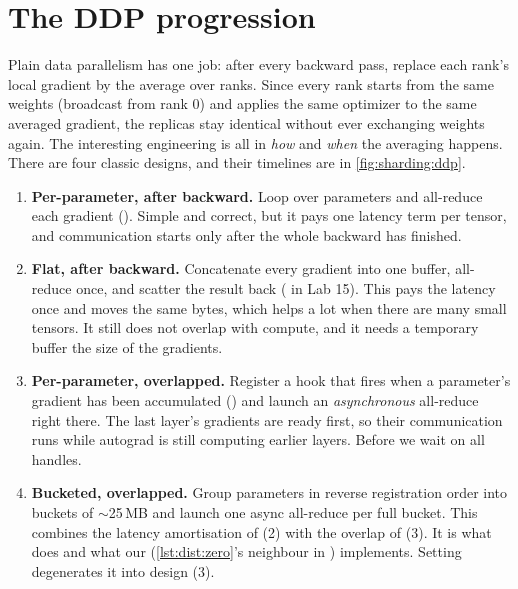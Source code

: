 \section{The DDP progression}\label{sec:sharding:ddp}

Plain data parallelism has one job: after every backward pass, replace each rank's local gradient
by the average over ranks. Since every rank starts from the same weights (broadcast from rank 0)
and applies the same optimizer to the same averaged gradient, the replicas stay identical without
ever exchanging weights again. The interesting engineering is all in \emph{how} and \emph{when}
the averaging happens. There are four classic designs, and their timelines are in
\cref{fig:sharding:ddp}.

\begin{enumerate}
  \item \textbf{Per-parameter, after backward.} Loop over parameters and all-reduce each
    gradient (). Simple and correct, but it pays one
    latency term per tensor, and communication starts only after the whole backward has finished.
  \item \textbf{Flat, after backward.} Concatenate every gradient into one buffer, all-reduce
    once, and scatter the result back ( in Lab 15). This pays the latency
    once and moves the same bytes, which helps a lot when there are many small tensors. It still
    does not overlap with compute, and it needs a temporary buffer the size of the gradients.
  \item \textbf{Per-parameter, overlapped.} Register a hook that fires when a parameter's gradient
    has been accumulated () and launch an
    \emph{asynchronous} all-reduce right there. The last layer's gradients are ready first, so their
    communication runs while autograd is still computing earlier layers. Before
     we wait on all handles.
  \item \textbf{Bucketed, overlapped.} Group parameters in reverse registration order into buckets of
    $\sim$25\,MB and launch one async all-reduce per full bucket. This combines the latency
    amortisation of (2) with the overlap of (3). It is what 
    does and what our  (\cref{lst:dist:zero}'s neighbour in
    ) implements. Setting  degenerates it into design (3).
\end{enumerate}

